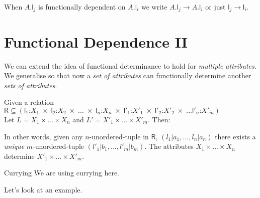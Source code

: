 \frmrule




When $A.\textsf{l}_j$ is functionally dependent on $A.\textsf{l}_i$ 
we write $A.\textsf{l}_j \rightarrow A.\textsf{l}_i$ or 
just $\textsf{l}_j \rightarrow \textsf{l}_i$.

\frmrule

\frmrule


\section{Functional Dependence II}

We can extend the idea of functional determinance to hold for 
\textit{multiple attributes}. We generalise so that now 
a \textit{set of attributes} can functionally determine 
another \textit{sets of attributes}.

Given a relation 
$\textsf{R} 
\subseteq 
(
\textsf{l}_1\text{:}X_1 \;\times\; 
\textsf{l}_2\text{:}X_2 \;\times\; 
... \;\times\; 
\textsf{l}_n\text{:}X_n \;\times\; 
\textsf{l}'_1\text{:}X'_1 \;\times\; 
\textsf{l}'_2\text{:}X'_2 \;\times\; 
...
\textsf{l}'_n\text{:}X'_m
)
$ 
\\
Let $L = X_1 \times ... \times X_n$ 
and $L' = X'_1 \times ... \times X'_m$. Then:


In other words, given any $n$-unordered-tuple in $\textsf{R}$, $(l_1|a_1, ..., l_n|a_n)$ there exists 
a \textit{unique} $m$-unordered-tuple $(l'_1|b_1, ..., l'_m|b_m)$. 
The attributes $X_1 \times ... \times X_n$ determine $X'_1 \times ... \times X'_m$.

\begin{sidenote}{Currying}
We are using currying here.
\end{sidenote}

Let's look at an example.

